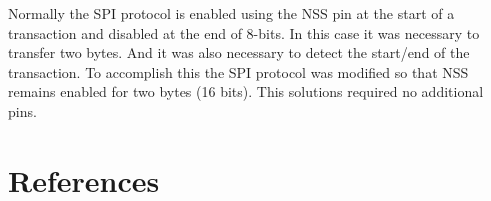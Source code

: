 \documentclass{article}
\begin{document}
Normally the SPI protocol is enabled using the NSS pin at the
start of a transaction and disabled at the end of 8-bits.
In this case it was necessary to transfer two bytes.
And it was also necessary to detect the start/end of the transaction.
To accomplish this the SPI protocol was modified so that NSS
remains enabled for two bytes (16 bits).
This solutions required no additional pins.


\clearpage

\pagebreak
\renewcommand*{\refname}{\vspace{-8mm}}
\section{References}
%


\end{document}
